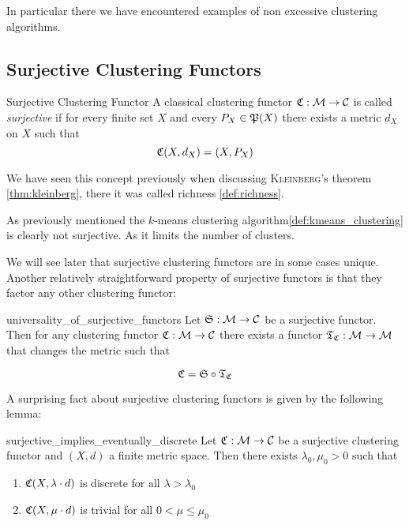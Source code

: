 In particular there we have encountered examples of non excessive clustering algorithms.



\subsection{Surjective Clustering Functors}
\begin{definition}{Surjective Clustering Functor}{}
A classical clustering functor $\Cf: \M \to \C$ is called \emph{surjective} if for every finite set $X$ and every $P_X \in \P(X)$ there exists a metric $d_X$ on $X$ such that
\begin{equation*}
    \Cf(X,d_X) = (X,P_X)
\end{equation*}
\end{definition}

We have seen this concept previously when discussing \textsc{Kleinberg}'s theorem \ref{thm:kleinberg}, there it was called richness \ref{def:richness}.

As previously mentioned the $k$-means clustering algorithm\ref{def:kmeans_clustering} is clearly not surjective. As it limits the number of clusters.

We will see later that surjective clustering functors are in some cases unique. Another relatively straightforward property of surjective functors is that they factor any other clustering functor:

\begin{proposition}{}{universality_of_surjective_functors}
Let $\mathfrak{S}: \M \to \C$ be a surjective functor. Then for any clustering functor $\Cf: \M \to \C$ there exists a functor $\Tf_\Cf: \M \to \M$ that changes the metric such that

\begin{equation*}
\Cf = \mathfrak{S} \circ \Tf_\Cf
\end{equation*}
\end{proposition}

A surprising fact about surjective clustering functors is given by the following lemma:

\begin{lemma}{}{surjective_implies_eventually_discrete}
Let $\Cf: \M \to \C$ be a surjective clustering functor and $(X,d)$ a finite metric space. Then there exists $\lambda_0, \mu_0 > 0$ such that
\begin{enumerate}
    \item $\Cf(X,\lambda \cdot d)$ is discrete for all $\lambda > \lambda_0$
    \item $\Cf(X,\mu \cdot d)$ is trivial for all $0 < \mu \le \mu_0$
\end{enumerate}
\end{lemma}

